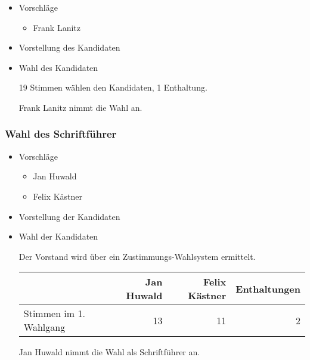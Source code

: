 \documentclass[11pt]{article}
\begin{document}
\begin{itemize}

\item Vorschläge\\
\label{sec-1.7.2.1}

\begin{itemize}
\item Frank Lanitz
\end{itemize}

\item Vorstellung des Kandidaten\\
\label{sec-1.7.2.2}


\item Wahl des Kandidaten\\
\label{sec-1.7.2.3}

19 Stimmen wählen den Kandidaten, 1 Enthaltung.

Frank Lanitz nimmt die Wahl an.
\end{itemize} %
\subsubsection{Wahl des Schriftführer}
\label{sec-1.7.3}

\begin{itemize}

\item Vorschläge\\
\label{sec-1.7.3.1}

\begin{itemize}
\item Jan Huwald
\item Felix Kästner
\end{itemize}

\item Vorstellung der Kandidaten\\
\label{sec-1.7.3.2}


\item Wahl der Kandidaten\\
\label{sec-1.7.3.3}



Der Vorstand wird über ein Zustimmungs-Wahlsystem ermittelt.


\begin{center}
\begin{tabular}{lrrr}
\hline
                         &  Jan Huwald  &  Felix Kästner  & Enthaltungen \\
\hline
 Stimmen im 1. Wahlgang  &          13  &             11  & 2\\
\hline
\end{tabular}
\end{center}



Jan Huwald nimmt die Wahl als Schriftführer an.

\end{itemize} %
\end{document}
